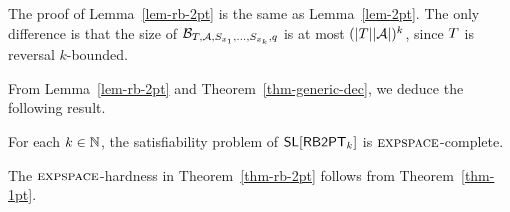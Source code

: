 The proof of Lemma~\ref{lem-rb-2pt} is the same as Lemma~\ref{lem-2pt}. The only difference is that the size of $\mathcal{B}_{T, \mathcal{A}, S_{x_1}, \ldots, S_{x_k}, q}$ is at most $(|T| |\mathcal{A}|)^k$, since $T$ is reversal $k$-bounded.

From Lemma~\ref{lem-rb-2pt} and Theorem~\ref{thm-generic-dec}, we deduce the following result.
%
\begin{theorem} \label{thm-rb-2pt}
For each $k \in \mathbb{N}$, the satisfiability problem of $\textsf{SL}[\textsf{RB2PT}_k]$ is $\textsc{expspace}$-complete. 
\end{theorem}

The $\textsc{expspace}$-hardness in Theorem~\ref{thm-rb-2pt} follows from Theorem~\ref{thm-1pt}.

%




%
%
